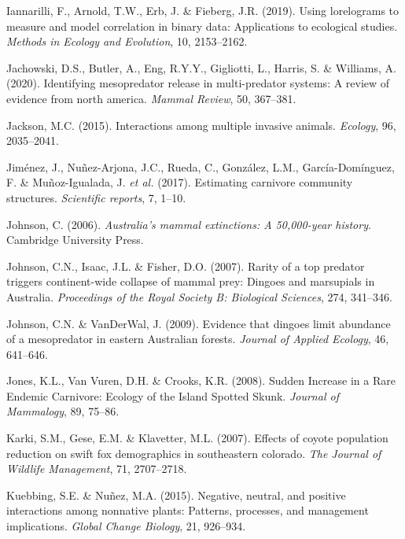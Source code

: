 \documentclass[11pt,a4paper,titlepage,twoside,openright]{style/unimelbthesis}
\begin{document}
\begin{mainmatter}
\leavevmode\hypertarget{ref-iannarilli2019lorelograms}{}%
Iannarilli, F., Arnold, T.W., Erb, J. \& Fieberg, J.R. (2019). Using lorelograms to measure and model correlation in binary data: Applications to ecological studies. \emph{Methods in Ecology and Evolution}, 10, 2153--2162.

\leavevmode\hypertarget{ref-jachowski2020identifying}{}%
Jachowski, D.S., Butler, A., Eng, R.Y.Y., Gigliotti, L., Harris, S. \& Williams, A. (2020). Identifying mesopredator release in multi-predator systems: A review of evidence from north america. \emph{Mammal Review}, 50, 367--381.

\leavevmode\hypertarget{ref-jackson2015interactions}{}%
Jackson, M.C. (2015). Interactions among multiple invasive animals. \emph{Ecology}, 96, 2035--2041.

\leavevmode\hypertarget{ref-jimenez2017estimating}{}%
Jiménez, J., Nuñez-Arjona, J.C., Rueda, C., González, L.M., García-Domínguez, F. \& Muñoz-Igualada, J. \emph{et al.} (2017). Estimating carnivore community structures. \emph{Scientific reports}, 7, 1--10.

\leavevmode\hypertarget{ref-johnson2006australia}{}%
Johnson, C. (2006). \emph{Australia's mammal extinctions: A 50,000-year history}. Cambridge University Press.

\leavevmode\hypertarget{ref-johnson2007rarity}{}%
Johnson, C.N., Isaac, J.L. \& Fisher, D.O. (2007). Rarity of a top predator triggers continent-wide collapse of mammal prey: Dingoes and marsupials in Australia. \emph{Proceedings of the Royal Society B: Biological Sciences}, 274, 341--346.

\leavevmode\hypertarget{ref-johnson2009evidence}{}%
Johnson, C.N. \& VanDerWal, J. (2009). Evidence that dingoes limit abundance of a mesopredator in eastern Australian forests. \emph{Journal of Applied Ecology}, 46, 641--646.

\leavevmode\hypertarget{ref-jones2008sudden}{}%
Jones, K.L., Van Vuren, D.H. \& Crooks, K.R. (2008). Sudden Increase in a Rare Endemic Carnivore: Ecology of the Island Spotted Skunk. \emph{Journal of Mammalogy}, 89, 75--86.

\leavevmode\hypertarget{ref-karki2007effects}{}%
Karki, S.M., Gese, E.M. \& Klavetter, M.L. (2007). Effects of coyote population reduction on swift fox demographics in southeastern colorado. \emph{The Journal of Wildlife Management}, 71, 2707--2718.

\leavevmode\hypertarget{ref-kuebbing2015negative}{}%
Kuebbing, S.E. \& Nuñez, M.A. (2015). Negative, neutral, and positive interactions among nonnative plants: Patterns, processes, and management implications. \emph{Global Change Biology}, 21, 926--934.


\end{mainmatter}
\end{document}
